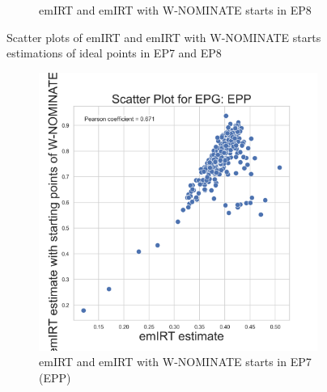 \documentclass[a4paper,12pt]{report}
\begin{document}
\begin{figure}[H]
\begin{subfigure}[b]{0.48\textwidth}
                        \caption{emIRT and emIRT with W-NOMINATE starts in EP8}
                        \label{fig:EMEIGEN_SCATTER_8}
                    \end{subfigure}
                    \caption
                    {Scatter plots of emIRT and emIRT with W-NOMINATE starts estimations of ideal points in EP7 and EP8}
                    \label{fig:EMEIGEN_SCATTER_7_8}
                \end{figure}
                \begin{figure}[H]
                    \centering
                    \begin{subfigure}[b]{0.48\textwidth}
                        \centering
                        \includegraphics[width=\textwidth]{Graphs/ScatterEMEIGEN_7_EPG_EPP}
                        \caption{emIRT and emIRT with W-NOMINATE starts in EP7 (EPP)}
                        \label{fig:EMEIGEN_SCATTER_7EPP}
                    \end{subfigure}
                    \hfill
                    \begin{subfigure}[b]{0.48\textwidth}
                        \centering

\end{subfigure}
\end{figure}
\end{document}
